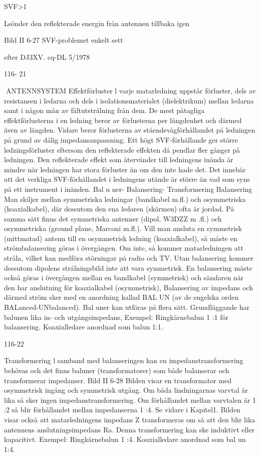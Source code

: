 \documentclass[a4paper,twoside,twocolumn,openright]{book}
\begin{document}
{{{{{SVF>1

Lsönder den reflekterade energin
från antennen tillbaka igen

Bild II 6-27 SVF-problemet enkelt sett

efter DJ3XV. cq-DL 5/1978

116- 21

ANTENNSYSTEM
Effektförluster
l varje matarledning uppstår förluster, dels
av resistansen i ledarna och dels i isolationsmaterialet (dielektrikum) mellan ledarna samt i någon mån av fältutstrålning från
dem. De mest påtagliga effektförlusterna i
en ledning beror av förlusterna per längdenhet och därmed även av längden. Vidare
beror förlusterna av ståendevågförhållandet på ledningen på grund av dålig impedansanpassning.
Ett högt SVF-förhållande ger större ledningsförluster eftersom den reflekterade effekten då pendlar fler gånger på ledningen.
Den reflekterade effekt som återvänder till
ledningens inända är mindre när ledningen
har stora förluster än om den inte hade det.
Det innebär att det verkliga SVF-förhållandet i ledningens utände är större än vad som
syns på ett instrument i inänden.
Bal u ner- Balansering- Transformering
Balansering
Man skiljer mellan symmetriska ledningar
(bandkabel m.fl.) och osymmetriska (koaxialkabel), där dessutom den ena ledaren (skärmen) ofta är jordad.
På samma sätt finns det symmetriska
antenner (dipol, W3DZZ m .fl.) och osymmetriska (ground plane, Marconi m.fl.).
Vill man ansluta en symmetrisk (mittmatad) antenn till en osymmetrisk ledning
(koaxialkabel), så måste en strömbalansering göras i övergången. Om inte, så kommer matarledningen att stråla, vilket kan
medföra störningar på radio och TV. Utan
balansering kommer dessutom dipolens
strålningsbild inte att vara symmetrisk.
En balansering måste också göras i övergången mellan en bandkabel (symmetrisk)
och sändaren när den har anslutning för
koaxialkabel (osymmetrisk),
Balansering av impedans och därmed
ström sker med en anordning kallad BAL UN
(av de engelska orden BALanced-UNbalanced).
Bal uner kan utföras på flera sätt. Grundläggande har balunen lika in- och utgångsimpedans,
Exempel:
Ringkärnebalun 1 :1 för balansering.
Koaxialledare anordnad som balun 1:1.

116-22

Transformering
l samband med balanseringen kan en
impedanstransformering behövas och det
finns baluner (transformatorer) som både
balanserar och transformerar impedanser.
Bild II 6-28
Bilden visar en transformator med osymmetrisk ingång och symmetrisk utgång. Om
båda lindningarnas varvtal är lika så sker
ingen impedanstransformering. Om förhållandet mellan varvtalen är 1 :2 så blir förhållandet mellan impedanserna 1 :4. Se vidare
i Kapitel1.
Bilden visar också att matarledningens
impedans Z transformeras om så att den blir
lika antennens anslutningsimpedans Ra.
Denna transformering kan ske induktivt eller kapacitivt.
Exempel:
Ringkärnebalun 1 :4.
Koaxialledare anordnad som bal un 1:4.

}}}}}
\end{document}
